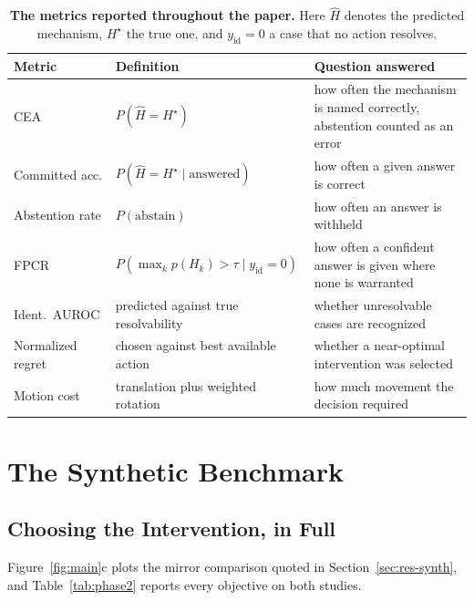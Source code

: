 \documentclass{article} %
\theoremstyle{defstyle}
\theoremstyle{plain}
\begin{document}
\begin{table}[!ht]
\caption{\textbf{The metrics reported throughout the paper.} Here $\hat{H}$ denotes the predicted
mechanism, $H^\star$ the true one, and $y_{\mathrm{id}} = 0$ a case that no action resolves.}
\label{tab:supp-metrics}
\begin{center}
\footnotesize
\begin{tabular}{llp{6.0cm}}
\toprule
\textbf{Metric} & \textbf{Definition} & \textbf{Question answered} \\
\midrule
CEA & $P(\hat{H} = H^\star)$ & how often the mechanism is named correctly, abstention counted as an error \\
Committed acc. & $P(\hat{H} = H^\star \mid \text{answered})$ & how often a given answer is correct \\
Abstention rate & $P(\text{abstain})$ & how often an answer is withheld \\
FPCR & $P(\max_k p(H_k) > \tau \mid y_{\mathrm{id}} = 0)$ & how often a confident answer is given where none is warranted \\
Ident.\ AUROC & predicted against true resolvability & whether unresolvable cases are recognized \\
Normalized regret & chosen against best available action & whether a near-optimal intervention was selected \\
Motion cost & translation plus weighted rotation & how much movement the decision required \\
\bottomrule
\end{tabular}
\end{center}
\end{table}

\section{The Synthetic Benchmark}

\subsection{Choosing the Intervention, in Full}
\label{sec:supp-phase2}

Figure~\ref{fig:main}c plots the mirror comparison quoted in Section~\ref{sec:res-synth},
and Table~\ref{tab:phase2} reports every objective on both studies.
\end{document}
